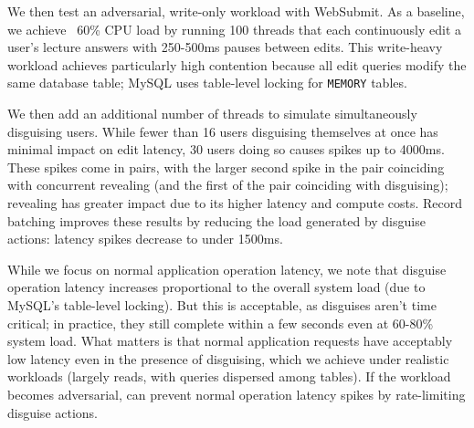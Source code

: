 We then test an adversarial, write-only workload with WebSubmit. As a baseline, we achieve ~60\% CPU
load by running 100 threads that each continuously edit a user's lecture answers with 250-500ms
pauses between edits. This write-heavy workload achieves particularly high contention because all
edit queries modify the same database table; MySQL uses table-level locking for \texttt{MEMORY}
tables.

We then add an additional number of threads to simulate simultaneously disguising users.  While
fewer than 16 users disguising themselves at once has minimal impact on edit latency, 30 users doing
so causes spikes up to 4000ms.  These spikes come in pairs, with the larger second spike in the pair
coinciding with concurrent revealing (and the first of the pair coinciding with disguising);
revealing has greater impact due to its higher latency and compute costs.
%
Record batching improves these results by reducing the load generated by disguise actions: latency
spikes decrease to under 1500ms.

While we focus on normal application operation latency, we note that
disguise operation latency increases proportional to the overall system load (\eg due to MySQL’s
table-level locking). But this is acceptable, as disguises aren't time critical; in practice, they
still complete within a few seconds even at 60-80\% system load.
%
What matters is that normal application requests have acceptably low latency even in the presence of
disguising, which we achieve under realistic workloads (largely reads, with queries dispersed among
tables). If the workload becomes adversarial, \sys can prevent normal operation latency spikes by
rate-limiting disguise actions.
